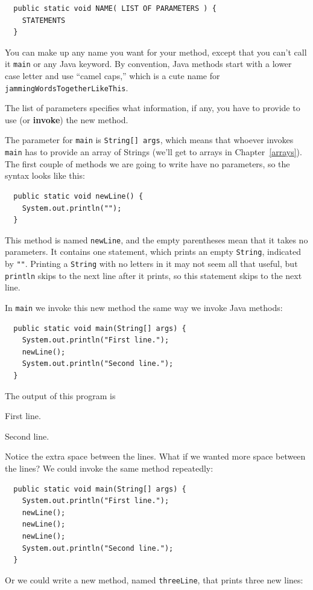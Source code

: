 \documentclass[12pt]{book}
\theoremstyle{exercise}
\begin{document}
\begin{lstlisting}
  public static void NAME( LIST OF PARAMETERS ) {
    STATEMENTS
  }
\end{lstlisting}
%
You can make up any name you want for your method, except
that you can't call it {\tt main} or any
Java keyword.  By convention, Java methods start with a lower
case letter and use ``camel caps,'' which is a cute name for
{\tt jammingWordsTogetherLikeThis}.

The list of parameters specifies what information, if any, you have to
provide to use (or {\bf invoke}) the new method.

The parameter for {\tt main} is {\tt String[] args}, which
means that whoever invokes {\tt main} has to provide an array of
Strings (we'll get to arrays in Chapter~\ref{arrays}).  The first
couple of methods we are going to write have no parameters, so the
syntax looks like this:

\begin{lstlisting}
  public static void newLine() {
    System.out.println("");
  }
\end{lstlisting}
%
This method is named {\tt newLine}, and the empty parentheses
mean that it takes no parameters.  It contains one
statement, which prints an empty {\tt String}, indicated by {\tt ""}.
Printing a {\tt String} with no letters in it may not seem all that
useful, but {\tt println} skips to the next
line after it prints, so this statement skips to the next line.

In {\tt main} we invoke this new method the same way we invoke
Java methods:

\begin{lstlisting}
  public static void main(String[] args) {
    System.out.println("First line.");
    newLine();
    System.out.println("Second line.");
  }
\end{lstlisting}
%
The output of this program is

\begin{minipage}{\linewidth}
\begin{verbatimtab}
First line.

Second line.
\end{verbatimtab}
\end{minipage}

Notice the extra space between the lines.  What if we wanted
more space between the lines?  We could invoke the same
method repeatedly:

\begin{lstlisting}
  public static void main(String[] args) {
    System.out.println("First line.");
    newLine();
    newLine();
    newLine();
    System.out.println("Second line.");
  }
\end{lstlisting}
%
Or we could write a new method, named {\tt threeLine}, that
prints three new lines:
\end{document}
